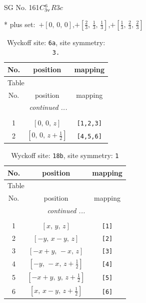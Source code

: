 \documentclass[fleqn,8pt]{jsarticle}
\begin{document}
\setcounter{MaxMatrixCols}{32}

\renewcommand{\tablename}{Table~}
\renewcommand{\figurename}{Figure~}
\begin{center}
\LARGE
SG No. 161\quad$C_{\rm 3v}^{6}$\quad$R3c$\quad[ trigonal ]
\end{center}
* plus set:\,\,\,$+\left[ 0,\, 0,\, 0 \right]$,\quad $+\left[ \frac{2}{3},\, \frac{1}{3},\, \frac{1}{3} \right]$,\quad $+\left[ \frac{1}{3},\, \frac{2}{3},\, \frac{2}{3} \right]$
\renewcommand{\arraystretch}{1.2}
\begin{longtable}{ccc}
\caption{Wyckoff site: {\tt 6a}, site symmetry: {\tt 3.}}
 \\
 \hline \hline
No. & position & mapping \\ \hline \endfirsthead

\multicolumn{2}{l}{\tablename\ \thetable{}} \\
 \hline \hline
No. & position & mapping \\ \hline \endhead

 \hline \hline
\multicolumn{2}{r}{\footnotesize\it continued ...} \\ \endfoot

 \hline \hline
\multicolumn{2}{r}{} \\ \endlastfoot

1 & $\left[ 0,\, 0,\, z \right]$ & {\tt [1,2,3]} \\ \hline
2 & $\left[ 0,\, 0,\, z + \frac{1}{2} \right]$ & {\tt [4,5,6]} \\
\end{longtable}
\renewcommand{\arraystretch}{1.2}
\begin{longtable}{ccc}
\caption{Wyckoff site: {\tt 18b}, site symmetry: {\tt 1}}
 \\
 \hline \hline
No. & position & mapping \\ \hline \endfirsthead

\multicolumn{2}{l}{\tablename\ \thetable{}} \\
 \hline \hline
No. & position & mapping \\ \hline \endhead

 \hline \hline
\multicolumn{2}{r}{\footnotesize\it continued ...} \\ \endfoot

 \hline \hline
\multicolumn{2}{r}{} \\ \endlastfoot

1 & $\left[ x,\, y,\, z \right]$ & {\tt [1]} \\ \hline
2 & $\left[ - y,\, x - y,\, z \right]$ & {\tt [2]} \\ \hline
3 & $\left[ - x + y,\, - x,\, z \right]$ & {\tt [3]} \\ \hline
4 & $\left[ - y,\, - x,\, z + \frac{1}{2} \right]$ & {\tt [4]} \\ \hline
5 & $\left[ - x + y,\, y,\, z + \frac{1}{2} \right]$ & {\tt [5]} \\ \hline
6 & $\left[ x,\, x - y,\, z + \frac{1}{2} \right]$ & {\tt [6]} \\
\end{longtable}
\end{document}
